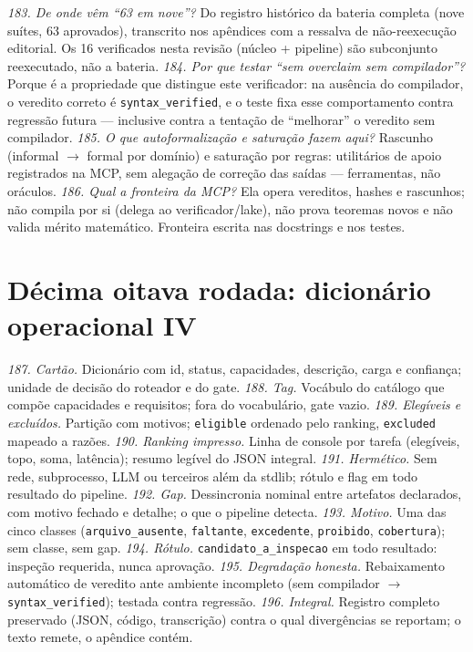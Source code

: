 \textit{183. De onde vêm ``63 em nove''?} Do registro histórico da bateria completa (nove suítes, 63 aprovados), transcrito nos apêndices com a ressalva de não-reexecução editorial. Os 16 verificados nesta revisão (núcleo + pipeline) são subconjunto reexecutado, não a bateria.
\textit{184. Por que testar ``sem overclaim sem compilador''?} Porque é a propriedade que distingue este verificador: na ausência do compilador, o veredito correto é \texttt{syntax\_verified}, e o teste fixa esse comportamento contra regressão futura --- inclusive contra a tentação de ``melhorar'' o veredito sem compilador.
\textit{185. O que autoformalização e saturação fazem aqui?} Rascunho (informal $\to$ formal por domínio) e saturação por regras: utilitários de apoio registrados na MCP, sem alegação de correção das saídas --- ferramentas, não oráculos.
\textit{186. Qual a fronteira da MCP?} Ela opera vereditos, hashes e rascunhos; não compila por si (delega ao verificador/lake), não prova teoremas novos e não valida mérito matemático. Fronteira escrita nas docstrings e nos testes.
\section{Décima oitava rodada: dicionário operacional IV}
\textit{187. Cartão.} Dicionário com id, status, capacidades, descrição, carga e confiança; unidade de decisão do roteador e do gate.
\textit{188. Tag.} Vocábulo do catálogo que compõe capacidades e requisitos; fora do vocabulário, gate vazio.
\textit{189. Elegíveis e excluídos.} Partição com motivos; \texttt{eligible} ordenado pelo ranking, \texttt{excluded} mapeado a razões.
\textit{190. Ranking impresso.} Linha de console por tarefa (elegíveis, topo, soma, latência); resumo legível do JSON integral.
\textit{191. Hermético.} Sem rede, subprocesso, LLM ou terceiros além da stdlib; rótulo e flag em todo resultado do pipeline.
\textit{192. Gap.} Dessincronia nominal entre artefatos declarados, com motivo fechado e detalhe; o que o pipeline detecta.
\textit{193. Motivo.} Uma das cinco classes (\texttt{arquivo\_ausente}, \texttt{faltante}, \texttt{excedente}, \texttt{proibido}, \texttt{cobertura}); sem classe, sem gap.
\textit{194. Rótulo.} \texttt{candidato\_a\_inspecao} em todo resultado: inspeção requerida, nunca aprovação.
\textit{195. Degradação honesta.} Rebaixamento automático de veredito ante ambiente incompleto (sem compilador $\to$ \texttt{syntax\_verified}); testada contra regressão.
\textit{196. Integral.} Registro completo preservado (JSON, código, transcrição) contra o qual divergências se reportam; o texto remete, o apêndice contém.
